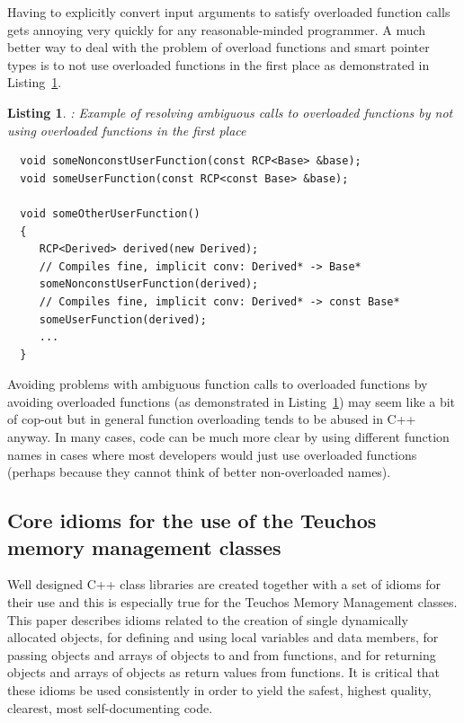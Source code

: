 \documentclass[pdf,ps2pdf,11pt]{SANDreport}
\newtheorem{listing}{Listing}
\begin{document}
Having to explicitly convert input arguments to satisfy overloaded
function calls gets annoying very quickly for any reasonable-minded
programmer.  A much better way to deal with the problem of overload
functions and smart pointer types is to not use overloaded functions
in the first place as demonstrated in
Listing~\ref{listing:overloaded-func-implicit-conv-nonoverload}.


{}\begin{listing}: Example of resolving ambiguous calls to overloaded
functions by not using overloaded functions in the first place
\label{listing:overloaded-func-implicit-conv-nonoverload}
{\small\begin{verbatim}
  void someNonconstUserFunction(const RCP<Base> &base);
  void someUserFunction(const RCP<const Base> &base);

  void someOtherUserFunction()
  {
     RCP<Derived> derived(new Derived);
     // Compiles fine, implicit conv: Derived* -> Base*
     someNonconstUserFunction(derived);
     // Compiles fine, implicit conv: Derived* -> const Base*
     someUserFunction(derived);
     ...
  }
\end{verbatim}}
\end{listing}


Avoiding problems with ambiguous function calls to overloaded
functions by avoiding overloaded functions (as demonstrated in
Listing~\ref{listing:overloaded-func-implicit-conv-nonoverload}) may
seem like a bit of cop-out but in general function overloading tends
to be abused in C++ anyway.  In many cases, code can be much more
clear by using different function names in cases where most developers
would just use overloaded functions (perhaps because they cannot think
of better non-overloaded names).


%
{}\subsection{Core idioms for the use of the Teuchos memory management
classes}
\label{sec:idioms}
%

Well designed C++ class libraries are created together with a set of
idioms for their use and this is especially true for the Teuchos
Memory Management classes.  This paper describes idioms related to the
creation of single dynamically allocated objects, for defining and
using local variables and data members, for passing objects and arrays
of objects to and from functions, and for returning objects and arrays
of objects as return values from functions.  It is critical that these
idioms be used consistently in order to yield the safest, highest
quality, clearest, most self-documenting code.
\end{document}
